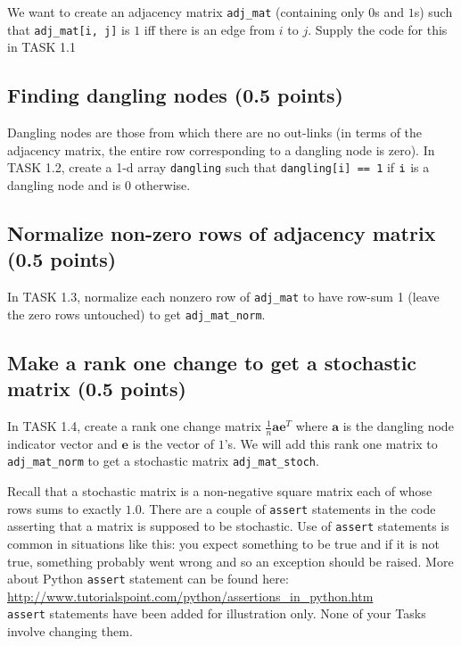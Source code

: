 \documentclass{article}
\begin{document}
We want to create an adjacency matrix \verb#adj_mat# (containing only $0$s and $1$s) such that \verb#adj_mat[i, j]# is $1$ iff there is an edge from $i$ to $j$. Supply the code for this in TASK 1.1

\subsection{Finding  dangling nodes (0.5 points)}

Dangling nodes are those from which there are no out-links (in terms of the adjacency matrix, the entire row corresponding to a dangling node is zero). In TASK 1.2, create a 1-d array {\tt dangling} such that {\tt dangling[i] == 1} if ${\tt i}$ is a dangling node and is $0$ otherwise.

\subsection{Normalize non-zero rows of adjacency matrix (0.5 points)}

In TASK 1.3, normalize each nonzero row of \verb#adj_mat# to have row-sum 1 (leave the zero rows untouched) to get \verb#adj_mat_norm#.

\subsection{Make a rank one change to get a stochastic matrix (0.5 points)}

In TASK 1.4, create a rank one change matrix $\frac{1}{n} \mathbf{a} \mathbf{e}^T$ where $\mathbf{a}$ is the dangling node indicator vector and $\mathbf{e}$ is the vector of $1$'s.
We will add this rank one matrix to {\tt adj\_mat\_norm} to get a stochastic matrix {\tt adj\_mat\_stoch}.

Recall that a stochastic matrix is a non-negative square matrix each of whose rows sums to exactly $1.0$. There are a couple of {\tt assert} statements in the code asserting that
a matrix is supposed to be stochastic. Use of {\tt assert} statements is common in situations like this: you expect something to be true and if it is not true, something probably went wrong
and so an exception should be raised. More about Python {\tt assert} statement can be found here:\\
\url{http://www.tutorialspoint.com/python/assertions_in_python.htm}\\
{\tt assert} statements have been added for illustration only. None of your Tasks involve changing them.
\end{document}
